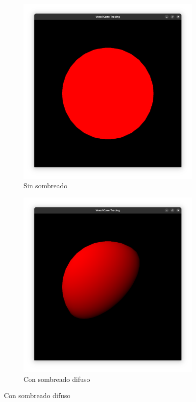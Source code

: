 \begin{figure}
    \begin{center}

    \begin{subfigure}{.24\textwidth}
        \includegraphics[width=\textwidth]{sphere-unshaded.png}
        \caption{Sin sombreado}
    \end{subfigure}

    \begin{subfigure}{.24\textwidth}
        \includegraphics[width=\textwidth]{sphere-diffuse.png}
        \caption{Con sombreado difuso}
    \end{subfigure}


\end{center}
\end{figure}
